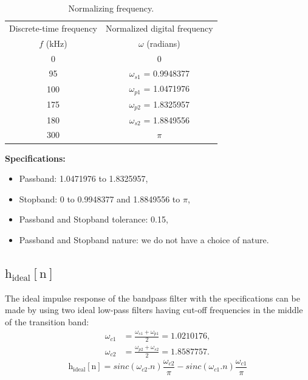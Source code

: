 \documentclass[12pt]{article}
\begin{document}
\begin{table}[h]
    \centering
    \begin{tabular}{|c|c|}\hline
         Discrete-time frequency&Normalized digital frequency\\
         $f$ (kHz)&$\omega$ (radians)\\\hline
         0&0\\\hline
         95&$\omega_{s1}$ = 0.9948377\\\hline
         100&$\omega_{p1}$ = 1.0471976\\\hline
         175&$\omega_{p2}$ = 1.8325957\\\hline
         180&$\omega_{s2}$ = 1.8849556\\\hline
         300&$\pi$\\\hline
    \end{tabular}
    \caption{Normalizing frequency.}
    \label{tab:1}
\end{table}
\newline
\hline
\vspace{10pt}
\textbf{Specifications:}
\begin{itemize}
    \item Passband: 1.0471976 to 1.8325957,
    \item Stopband: 0 to 0.9948377 and 1.8849556 to  $\pi$,
    \item Passband and Stopband tolerance: 0.15,
    \item Passband and Stopband nature: we do not have a choice of nature.
\end{itemize}
\hline

\newpage
\subsection{$\text{h}_\text{ideal}[\text{n}]$}
The ideal impulse response of the bandpass filter with the specifications can be made by using two ideal low-pass filters having cut-off frequencies in the middle of the transition band:
\begin{align*}
    \omega_{c1} &= \frac{\omega_{s1} + \omega_{p1}}{2} = 1.0210176,\\
    \omega_{c2} &= \frac{\omega_{p2} + \omega_{s2}}{2} = 1.8587757.
\end{align*}
\[\text{h}_\text{ideal}[\text{n}] = sinc(\omega_{c2}.n)\frac{\omega_{c2}}{\pi} - sinc(\omega_{c1}.n)\frac{\omega_{c1}}{\pi}\]
\end{document}
